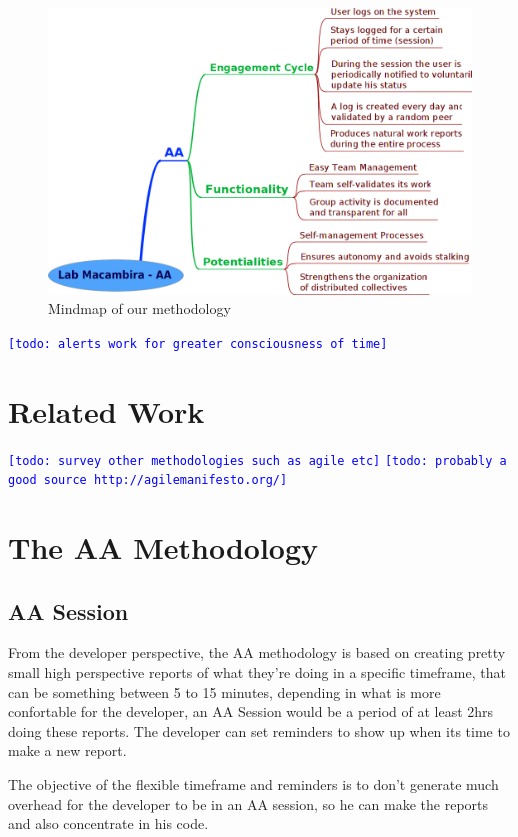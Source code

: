 \documentclass[letterpaper]{article}
\newcommand{\indraftnote}[1]{\textcolor{blue}{\texttt{\footnotesize[#1]}}}
\newcommand{\todo}[1]{\indraftnote{todo: #1}}
\begin{document}
\begin{figure}
\begin{center}
   \includegraphics[width=0.8\linewidth,keepaspectratio=true]{figs/aa-mm.png}
\end{center}
   \caption{
   Mindmap of our methodology
   }
\label{fig:mm}
\end{figure}

\todo{alerts work for greater consciousness of time}

\section{Related Work}
\todo{survey other methodologies such as agile etc}
\todo{probably a good source http://agilemanifesto.org/}

\section{The AA Methodology}

\subsection{AA Session}

From the developer perspective, the AA methodology is based on creating pretty
small high perspective reports of what they're doing in a specific timeframe,
that can be something between 5 to 15 minutes, depending in what is more
confortable for the developer, an AA Session would be a period of at least 2hrs
doing these reports. The developer can set reminders to show up when its time
to make a new report.

The objective of the flexible timeframe and reminders is to don't generate much
overhead for the developer to be in an AA session, so he can make the reports
and also concentrate in his code.
\end{document}
